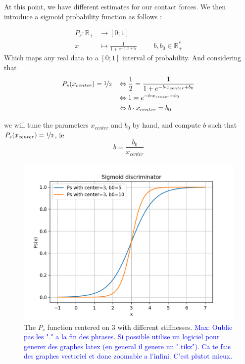 \documentclass[a4paper,10pt]{article}
\newcommand{\mnaveau}[1]{\textcolor{blue}{Max: #1}}
\begin{document}
At this point, we have different estimates for our contact forces. We then introduce a sigmoid probability function as follows :

\begin{align*}
  P_s : \mathbb{R}_+ &\rightarrow [0; 1]\\
  x &\mapsto \frac{1}{1 + e^{-b \cdot x + b_0}} \hspace{1cm} b, b_0  \in\mathbb{R}_+^*
\end{align*}
Which maps any real data to a $[0; 1]$ interval of probability.
And considering that
\begin{align*}
	P_s(x_{center}) = \nicefrac{1}{2} \hspace{3mm} &\Leftrightarrow \frac{1}{2} = \frac{1}{1 + e^{-b \cdot x_{center} + b_0}}\\
						&\Leftrightarrow 1  =e^{-b \cdot x_{center} + b_0}\\
						&\Leftrightarrow b\cdot x_{center} = b_0
\end{align*}

we will tune the parameters $x_{center}$ and $b_0$ by hand, and compute $b$ such that $P_s(x_{center}) = \nicefrac{1}{2} $, ie
$$b = \frac{b_0}{x_{center}}$$

\begin{figure}[H]
\centering
  \includegraphics[width=\linewidth, angle=0, scale=0.8]{./images/ProbDisc_1.png}
  \caption{The $P_s$ function centered on $3$ with different stiffnesses. \mnaveau{Oublie pas les "." a la fin des phrases. Si possible utilise un logiciel pour generer des graphes latex (en general il genere un ".tikz"). Ca te fais des graphes vectoriel et donc zoomable a l'infini. C'est plutot mieux.}}
\end{figure}
\end{document}
